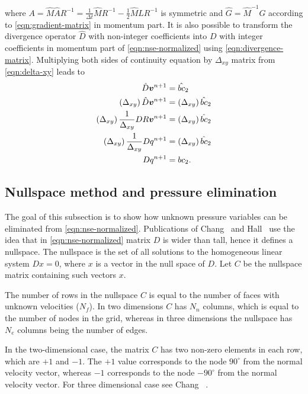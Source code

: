 \documentclass{article}
\begin{document}
where $A=\hat{M}\hat{A}R^{-1}=\frac{1}{\Delta t}\hat{M}R^{-1}-\frac{1}{2}\hat{M}\hat{L}R^{-1}$ is symmetric and $\hat{G}=\hat{M}^{-1}G$ according to \cref{eqn:gradient-matrix} in momentum part. It is also possible to transform the divergence operator $\hat{D}$ with non-integer coefficients into $D$ with integer coefficients in momentum part of \cref{eqn:nse-normalized} using  \cref{eqn:divergence-matrix}. Multiplying both sides of continuity equation by $\Delta _{xy}$ matrix from \cref{eqn:delta-xy} leads to 
\begin{align*}
	\hat{D}\boldsymbol{v}^{n+1}&= \hat{bc}_2\notag\\
	\left(\Delta_{xy} \right)\hat{D}\boldsymbol{v}^{n+1}&=\left ( \Delta_{xy}\right ) \hat{bc}_2\notag\\
	\left(\Delta_{xy}\right)\frac{1}{\Delta _{xy}}{D}R\boldsymbol{v}^{n+1}&=\left ( \Delta_{xy}\right ) \hat{bc}_2\notag\\
	\left(\Delta_{xy}\right)\frac{1}{\Delta_{xy}}{D}q^{n+1}&=\left ( \Delta_{xy}\right ) \hat{bc}_2\notag\\
	D{q}^{n+1}&=bc_2.
\end{align*}

\subsection{Nullspace method and pressure elimination}\label{sec:nullspace-method}

The goal of this subsection is to show how unknown pressure variables can be eliminated from \cref{eqn:nse-normalized}. Publications of Chang~\cite{Chang:2002} and Hall~\cite{Hall:1980} use the idea that in \cref{eqn:nse-normalized} matrix $D$ is wider than tall, hence it defines a nullspace. The nullspace is the set of all solutions to the homogeneous linear system $Dx = 0$, where $x$ is a vector in the null space of $D$. Let $C$ be the nullspace matrix containing such vectors $x$. 

The number of rows in the nullspace $C$ is equal to the number of faces with unknown velocities ($N_f$). In two dimensions $C$ has $N_n$ columns, which is equal to the number of nodes in the grid, whereas in three dimensions the nullspace has $N_e$ columns being the number of edges. 

In the two-dimensional case, the matrix $C$ has two non-zero elements in each row, which are $+1$ and $-1$. The $+1$ value corresponds to the node $90^\circ$ from the normal velocity vector, whereas $-1$ corresponds to the node $-90^\circ$ from the normal velocity vector.  For three dimensional case see Chang ~\cite{Chang:2002}.
\end{document}
